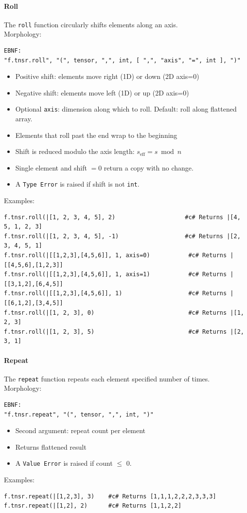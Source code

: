 \paragraph{Roll}
The \texttt{roll} function circularly shifts elements along an axis.\\
Morphology:
\begin{verbatim}
EBNF:
"f.tnsr.roll", "(", tensor, ",", int, [ ",", "axis", "=", int ], ")"
\end{verbatim}
\begin{itemize}
\item Positive shift: elements move right (1D) or down (2D axis=0)
\item Negative shift: elements move left (1D) or up (2D axis=0)
\item Optional \texttt{axis}: dimension along which to roll. Default: roll along flattened array.
\item Elements that roll past the end wrap to the beginning
\item Shift is reduced modulo the axis length: $s_{\text{eff}} = s \bmod n$
\item Single element and shift $= 0$ return a copy with no change.
\item A \texttt{Type Error} is raised if shift is not \texttt{int}.
\end{itemize}
Examples:
\begin{verbatim}
f.tnsr.roll(|[1, 2, 3, 4, 5], 2)                    #c# Returns |[4, 5, 1, 2, 3]
f.tnsr.roll(|[1, 2, 3, 4, 5], -1)                   #c# Returns |[2, 3, 4, 5, 1]
f.tnsr.roll(|[[1,2,3],[4,5,6]], 1, axis=0)           #c# Returns |[[4,5,6],[1,2,3]]
f.tnsr.roll(|[[1,2,3],[4,5,6]], 1, axis=1)           #c# Returns |[[3,1,2],[6,4,5]]
f.tnsr.roll(|[[1,2,3],[4,5,6]], 1)                   #c# Returns |[[6,1,2],[3,4,5]]
f.tnsr.roll(|[1, 2, 3], 0)                           #c# Returns |[1, 2, 3]
f.tnsr.roll(|[1, 2, 3], 5)                           #c# Returns |[2, 3, 1]
\end{verbatim}

\paragraph{Repeat}
The \texttt{repeat} function repeats each element specified number of times.\\
Morphology:
\begin{verbatim}
EBNF:
"f.tnsr.repeat", "(", tensor, ",", int, ")"
\end{verbatim}
\begin{itemize}
\item Second argument: repeat count per element
\item Returns flattened result
\item A \texttt{Value Error} is raised if count $\leq$ 0.
\end{itemize}
Examples:
\begin{verbatim}
f.tnsr.repeat(|[1,2,3], 3)    #c# Returns [1,1,1,2,2,2,3,3,3]
f.tnsr.repeat(|[1,2], 2)      #c# Returns [1,1,2,2]
\end{verbatim}

